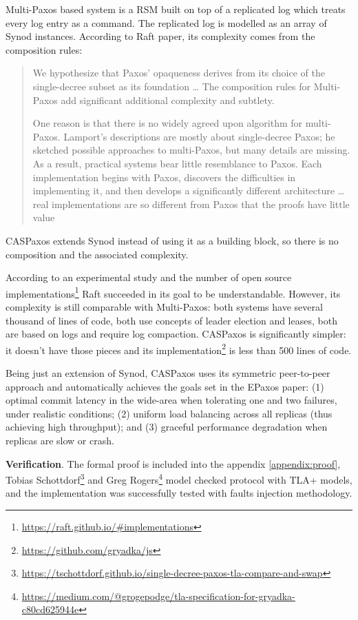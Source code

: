 \documentclass[12pt]{article}
\theoremstyle{definition}
\begin{document}
Multi-Paxos based system is a RSM built on top of a replicated log which treats every log entry as a command. The replicated log is modelled as an array of Synod instances. According to Raft paper, its complexity comes from the composition rules:

\begin{quote}
We hypothesize that Paxos’ opaqueness derives from its choice of the single-decree subset as its foundation \ldots{} The composition rules for Multi-Paxos add significant additional complexity and subtlety.

One reason is that there is no widely agreed upon algorithm for multi-Paxos. Lamport’s descriptions are mostly about single-decree Paxos; he sketched possible approaches to multi-Paxos, but many details are missing. As a result, practical systems bear little resemblance to Paxos. Each implementation begins with Paxos, discovers the difficulties in implementing it, and then develops a significantly different architecture \ldots{} real implementations are so different from Paxos that the proofs have little value
\end{quote}

CASPaxos extends Synod instead of using it as a building block, so there is no composition and the associated complexity.

According to an experimental study\cite{raft} and the number of open source implementations\footnote{\href{https://raft.github.io/\#implementations}{https://raft.github.io/\#implementations}} Raft succeeded in its goal to be understandable. However, its complexity is still comparable with Multi-Paxos: both systems\cite{chubby}\cite{raft} have several thousand of lines of code, both use concepts of leader election and leases, both are based on logs and require log compaction. CASPaxos is significantly simpler: it doesn't have those pieces and its implementation\footnote{\href{https://github.com/gryadka/js}{https://github.com/gryadka/js}} is less than 500 lines of code.

Being just an extension of Synod, CASPaxos uses its symmetric peer-to-peer approach and automatically achieves the goals set in the EPaxos\cite{epaxos} paper: (1) optimal commit latency in the wide-area when tolerating one and two failures, under realistic conditions; (2) uniform load balancing across all replicas (thus achieving high throughput); and (3) graceful performance degradation when replicas are slow or crash.

{\bf Verification}. The formal proof is included into the appendix \ref{appendix:proof}, Tobias Schottdorf\footnote{\href{https://tschottdorf.github.io/single-decree-paxos-tla-compare-and-swap}{https://tschottdorf.github.io/single-decree-paxos-tla-compare-and-swap}} and Greg Rogers\footnote{\href{https://medium.com/@grogepodge/tla-specification-for-gryadka-c80cd625944e}{https://medium.com/@grogepodge/tla-specification-for-gryadka-c80cd625944e}} model checked protocol with TLA+ models, and the implementation was successfully tested with faults injection methodology.
\end{document}
